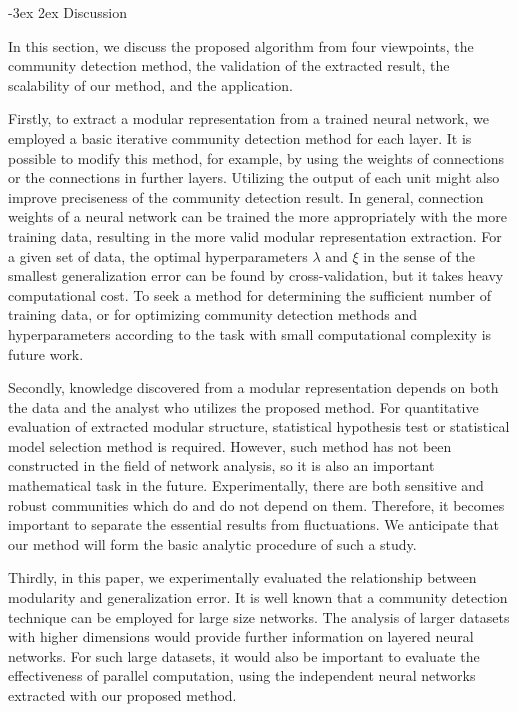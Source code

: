 \documentclass[12pt]{article} %
\makeatletter
\renewcommand\section{\@startsection {section}{1}%
{\z@}%
{-3ex}%
{2ex}%
{\normalfont\normalsize\bfseries}}
\makeatother
\begin{document}
\section{Discussion} %
\label{sec:discussion}

In this section, we discuss the proposed algorithm from four viewpoints, the community detection method, the validation of the extracted result, the scalability of our method, and the application. 

Firstly, to extract a modular representation from a trained neural network, we employed a basic iterative community detection method for each layer. It is possible to modify this method, for example, by using the weights of connections or the connections in further layers. Utilizing the output of each unit might also improve preciseness of the community detection result. 
In general, connection weights of a neural network can be trained the more appropriately with the more training data, resulting in the more valid modular representation extraction. For a given set of data, the optimal hyperparameters $\lambda$ and $\xi$ in the sense of the smallest generalization error can be found by cross-validation, but it takes heavy computational cost. To seek a method for determining the sufficient number of training data, or for optimizing community detection methods and hyperparameters according to the task with small computational complexity is future work.

Secondly, knowledge discovered from a modular representation depends on both the data and the analyst who utilizes the proposed method. For quantitative evaluation of extracted modular structure, statistical hypothesis test or statistical model selection method is required. However, such method has not been constructed in the field of network analysis, so it is also an important mathematical task in the future. Experimentally, there are both sensitive and robust communities which do and do not depend on them. Therefore, it becomes important to separate the essential results from fluctuations. We anticipate that our method will form the basic analytic procedure of such a study. 

Thirdly, in this paper, we experimentally evaluated the relationship between modularity and generalization error. It is well known that a community detection technique can be employed for large size networks. The analysis of larger datasets with higher dimensions would provide further information on layered neural networks. For such large datasets, it would also be important to evaluate the effectiveness of parallel computation, using the independent neural networks extracted with our proposed method. 
\end{document}
